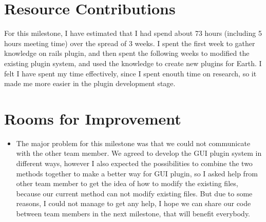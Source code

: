 \documentclass{article}
\begin{document}
\section*{Resource Contributions}

For this milestone, I have estimated that I had spend about 73 hours (including 5 hours meeting time) over the spread of 3 weeks. I spent the first week to gather knowledge on rails plugin, and then spent the following weeks to modified the existing plugin system, and used the knowledge to create new plugins for Earth. I felt I have spent my time effectively, since I spent enouth time on research, so it made me more easier in the plugin development stage. 

\section*{Rooms for Improvement}

\begin{itemize}
   \item The major problem for this milestone was that we could not communicate with the other team member. We agreed to develop the GUI plugin system in different ways, however I also expected the possibilities to combine the two methods together to make a better way for GUI plugin, so I asked help from other team member to get the idea of how to modify the existing files, because our current method can not modify existing files. But due to some reasons, I could not manage to get any help, I hope we can share our code between team members in the next milestone, that will benefit everybody.
\end{itemize}
\end{document}
